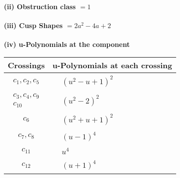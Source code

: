 \documentclass[1p]{elsarticle_modified}
\theoremstyle{definition}
\begin{document}
\flushleft \textbf{(ii) Obstruction class $= 1$}\\~\\
\flushleft \textbf{(iii) Cusp Shapes $= 2 a^2-4 a+2$}\\~\\
\newpage\renewcommand{\arraystretch}{1}
\flushleft \textbf{(iv) u-Polynomials at the component}\newline \\
\begin{tabular}{m{50pt}|m{274pt}}
Crossings & \hspace{64pt}u-Polynomials at each crossing \\
\hline $$\begin{aligned}c_{1},c_{2},c_{5}\end{aligned}$$&$\begin{aligned}
&(u^2- u+1)^2
\end{aligned}$\\
\hline $$\begin{aligned}c_{3},c_{4},c_{9}\\c_{10}\end{aligned}$$&$\begin{aligned}
&(u^2-2)^2
\end{aligned}$\\
\hline $$\begin{aligned}c_{6}\end{aligned}$$&$\begin{aligned}
&(u^2+u+1)^2
\end{aligned}$\\
\hline $$\begin{aligned}c_{7},c_{8}\end{aligned}$$&$\begin{aligned}
&(u-1)^4
\end{aligned}$\\
\hline $$\begin{aligned}c_{11}\end{aligned}$$&$\begin{aligned}
&u^4
\end{aligned}$\\
\hline $$\begin{aligned}c_{12}\end{aligned}$$&$\begin{aligned}
&(u+1)^4
\end{aligned}$\\
\hline
\end{tabular}\\~\\
\end{document}
